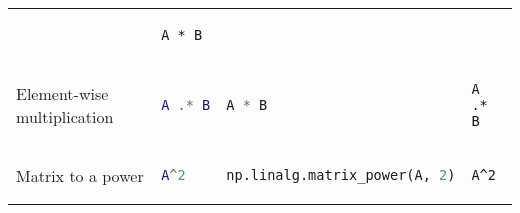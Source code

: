 \begin{tabular}[]{@{}llll@{}}
\begin{minipage}[t]{0.23\columnwidth}
\end{minipage} & \begin{minipage}[t]{0.20\columnwidth}\raggedright
\begin{lstlisting}
A * B
\end{lstlisting}

\end{minipage}\tabularnewline
\begin{minipage}[t]{0.23\columnwidth}\raggedright
Element-wise multiplication
\end{minipage} & \begin{minipage}[t]{0.22\columnwidth}\raggedright
\begin{lstlisting}[language=Matlab]
A .* B
\end{lstlisting}

\end{minipage} & \begin{minipage}[t]{0.23\columnwidth}\raggedright
\begin{lstlisting}[language=Python]
A * B
\end{lstlisting}

\end{minipage} & \begin{minipage}[t]{0.20\columnwidth}\raggedright
\begin{lstlisting}
A .* B
\end{lstlisting}

\end{minipage}\tabularnewline
\begin{minipage}[t]{0.23\columnwidth}\raggedright
Matrix to a power
\end{minipage} & \begin{minipage}[t]{0.22\columnwidth}\raggedright
\begin{lstlisting}[language=Matlab]
A^2
\end{lstlisting}

\end{minipage} & \begin{minipage}[t]{0.23\columnwidth}\raggedright
\begin{lstlisting}[language=Python]
np.linalg.matrix_power(A, 2)
\end{lstlisting}

\end{minipage} & \begin{minipage}[t]{0.20\columnwidth}\raggedright
\begin{lstlisting}
A^2
\end{lstlisting}


\end{minipage}
\end{tabular}
